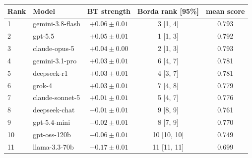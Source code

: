\begin{tabular}{llccc}
\toprule
Rank & Model & BT strength & Borda rank [95\%] & mean score \\
\midrule
1 & gemini-3.8-flash & $+0.06 \pm 0.01$ & 3 [1, 4] & 0.793 \\
2 & gpt-5.5 & $+0.05 \pm 0.01$ & 1 [1, 3] & 0.792 \\
3 & claude-opus-5 & $+0.04 \pm 0.00$ & 2 [1, 3] & 0.793 \\
4 & gemini-3.1-pro & $+0.03 \pm 0.01$ & 6 [4, 7] & 0.781 \\
5 & deepseek-r1 & $+0.03 \pm 0.01$ & 4 [3, 7] & 0.781 \\
6 & grok-4 & $+0.03 \pm 0.01$ & 7 [4, 8] & 0.779 \\
7 & claude-sonnet-5 & $+0.01 \pm 0.01$ & 5 [4, 7] & 0.776 \\
8 & deepseek-chat & $-0.01 \pm 0.01$ & 9 [8, 9] & 0.761 \\
9 & gpt-5.4-mini & $-0.02 \pm 0.01$ & 8 [7, 9] & 0.770 \\
10 & gpt-oss-120b & $-0.06 \pm 0.01$ & 10 [10, 10] & 0.749 \\
11 & llama-3.3-70b & $-0.17 \pm 0.01$ & 11 [11, 11] & 0.699 \\
\bottomrule
\end{tabular}
